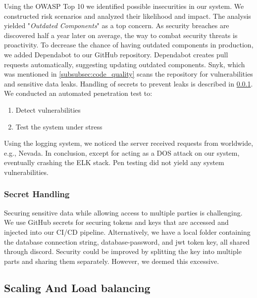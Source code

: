 Using the OWASP Top 10\cite{owasp} we identified possible insecurities in our system. We constructed risk scenarios and analyzed their likelihood and impact. 
The analysis yielded "\textit{Outdated Components}" as a top concern. As security breaches are discovered half a year later on average, the way to combat security threats is proactivity\cite{securitylecture}. To decrease the chance of having outdated components in production, we added Dependabot to our GitHub repository. Dependabot creates pull requests automatically, suggesting updating outdated components. Snyk, which was mentioned in \ref{subsubsec:code_quality} scans the repository for vulnerabilities and sensitive data leaks. Handling of secrets to prevent leaks is described in \ref{subsubsec:secrets}.
We conducted an automated penetration test to:
\begin{enumerate}
    \item Detect vulnerabilities
    \item Test the system under stress
\end{enumerate}
Using the logging system, we noticed the server received requests from worldwide, e.g., Nevada. In conclusion, except for acting as a DOS attack on our system, eventually crashing the ELK stack. Pen testing did not yield any system vulnerabilities.

\subsubsection{Secret Handling}
\label{subsubsec:secrets}
Securing sensitive data while allowing access to multiple parties is challenging. We use GitHub secrets for securing tokens and keys that are accessed and injected into our CI/CD pipeline. Alternatively, we have a local folder containing the database connection string, database-password, and jwt token key, all shared through discord. Security could be improved by splitting the key into multiple parts and sharing them separately. However, we deemed this excessive.
\clearpage
\subsection{Scaling And Load balancing}
\label{subsec:scaling}


